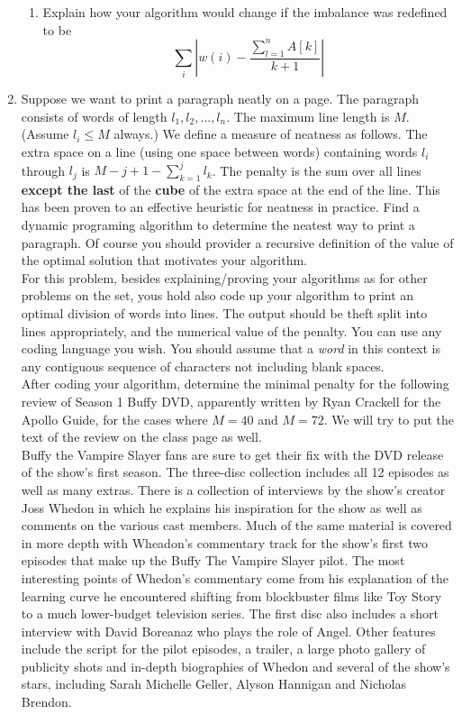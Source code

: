 \documentclass[tikz, 12pt]{scrartcl}
\begin{document}
\begin{enumerate}
\begin{enumerate}
		\item Explain how your algorithm would change if the imbalance was redefined to be
			$$
	\sum_{i} \left| w(i) - \frac{\sum_{l = 1}^n A[k]}{k + 1} \right|
	$$
	\end{enumerate}
	\item Suppose we want to print a paragraph neatly on a page. The paragraph consists of words of length $l_1, l_2, \ldots, l_n$. The maximum line length is $M$. (Assume $l_i \leq M$ always.) We define a measure of neatness as follows. The extra space on a line (using one space between words) containing words $l_i$ through $l_j$ is $M - j + 1 - \sum_{k =1}^{j} l_k$. The penalty is the sum over all lines \textbf{except the last} of the \textbf{cube} of the extra space at the end of the line. This has been proven to an effective heuristic for neatness in practice. Find a dynamic programing algorithm to determine the neatest way to print a paragraph. Of course you should provider a recursive definition of the value of the optimal solution that motivates your algorithm.\\
	For this problem, besides explaining/proving your algorithms as for other problems on the set, yous hold also code up your algorithm to print an optimal division of words into lines. The output should be theft split into lines appropriately, and the numerical value of the penalty. You can use any coding language you wish. You should assume that a \textit{word} in this context is any contiguous sequence of characters not including blank spaces.\\
	After coding your algorithm, determine the minimal penalty for the following review of Season 1 Buffy DVD, apparently written by Ryan Crackell for the Apollo Guide, for the cases where $M = 40$ and $M = 72$. We will try to put the text of the review on the class page as well.\\
	Buffy the Vampire Slayer fans are sure to get their fix with the DVD release of the show's first season. The three-disc collection includes all 12 episodes as well as many extras. There is a collection of interviews by the show's creator Joss Whedon in which he explains his inspiration for the show as well as comments on the various cast members. Much of the same material is covered in more depth with Wheadon's commentary track for the show's first two episodes that make up the Buffy The Vampire Slayer pilot. The most interesting points of Whedon's commentary come from his explanation of the learning curve he encountered shifting from blockbuster films like Toy Story to a much lower-budget television series. The first disc also includes a short interview with David Boreanaz who plays the role of Angel. Other features include the script for the pilot episodes, a trailer, a large photo gallery of publicity shots and in-depth biographies of Whedon and several of the show's stars, including Sarah Michelle Geller, Alyson Hannigan and Nicholas Brendon.
\end{enumerate}
\end{document}
